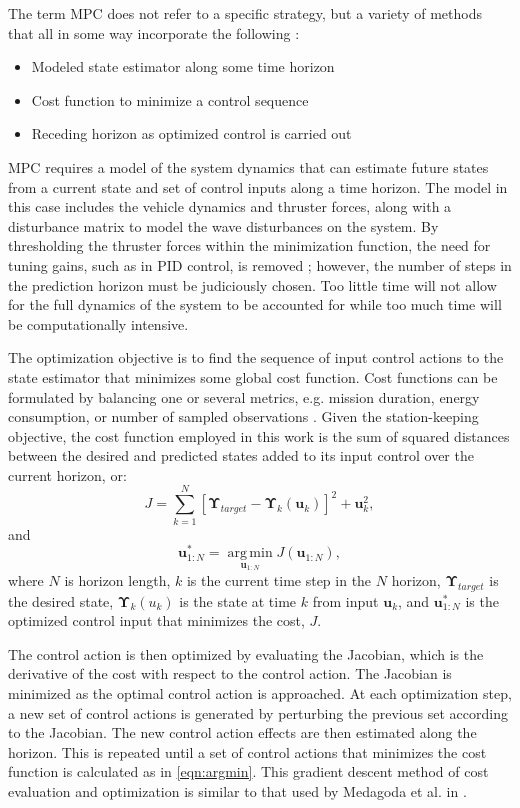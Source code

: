 \documentclass[letterpaper, 10 pt, conferences]{IEEEconf}  %
\renewcommand{\vec}[1]{\mathbf{#1}}
\begin{document}
The term MPC does not refer to a specific strategy, but a variety of methods that all in some way incorporate the following \cite{camacho}:
\begin{itemize}
  \itemsep0.25em
  \item Modeled state estimator along some time horizon
  \item Cost function to minimize a control sequence 
  \item Receding horizon as optimized control is carried out 
\end{itemize}

MPC requires a model of the system dynamics that can estimate future states from a current state and set of control inputs along a time horizon. The model in this case includes the vehicle dynamics and thruster forces, along with a disturbance matrix to model the wave disturbances on the system. By thresholding the thruster forces within the minimization function, the need for tuning gains, such as in PID control, is removed \cite{rawlings}; however, the number of steps in the prediction horizon must be judiciously chosen. Too little time will not allow for the full dynamics of the system to be accounted for while too much time will be computationally intensive. 

The optimization objective is to find the sequence of input control actions to the state estimator that minimizes some global cost function. Cost functions can be formulated by balancing one or several metrics, e.g. mission duration, energy consumption, or number of sampled observations \cite{lavalle, binney}. Given the station-keeping objective, the cost function employed in this work is the sum of squared distances between the desired and predicted states added to its input control over the current horizon, or:
\begin{equation}
J = \sum_{k=1}^{N}[\vec{\Upsilon}_{target} - \vec{\Upsilon}_k(\vec{u}_k)]^2 + \vec{u}_k^2,
\label{eqn:cost}
\end{equation}
and
\begin{equation}
\vec{u}_{1:N}^* = \operatorname*{arg\,min}_{\vec{u}_{1:N}} J(\vec{u}_{1:N}),
\label{eqn:argmin}
\end{equation}
where $N$ is horizon length, $k$ is the current time step in the $N$ horizon, $\vec{\Upsilon}_{target}$ is the desired state, $\vec{\Upsilon}_k(u_k)$ is the state at time $k$ from input $\vec{u}_k$, and $\vec{u}_{1:N}^*$ is the optimized control input that minimizes the cost, $J$. 

The control action is then optimized by evaluating the Jacobian, which is the derivative of the cost with respect to the control action. The Jacobian is minimized as the optimal control action is approached. At each optimization step, a new set of control actions is generated by perturbing the previous set according to the Jacobian. The new control action effects are then estimated along the horizon. This is repeated until a set of control actions that minimizes the cost function is calculated as in \eqref{eqn:argmin}. This gradient descent method of cost evaluation and optimization is similar to that used by Medagoda et al. in \cite{medagodaMPC}.
\end{document}
